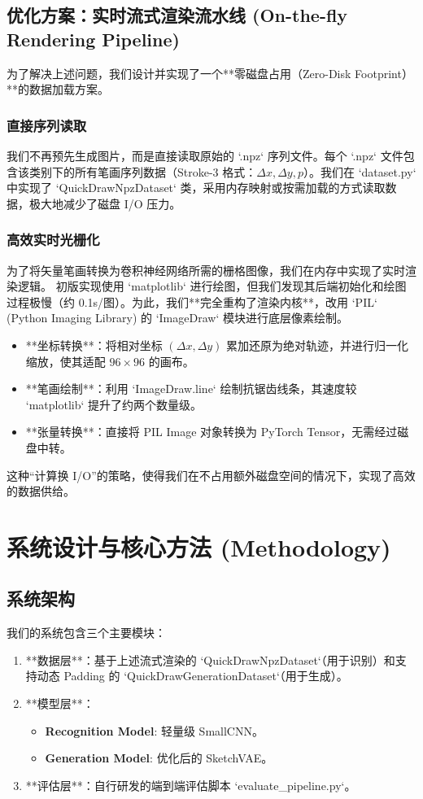 \documentclass{sjtuarticle}
\begin{document}
\subsection{优化方案：实时流式渲染流水线 (On-the-fly Rendering Pipeline)}
为了解决上述问题，我们设计并实现了一个**零磁盘占用（Zero-Disk Footprint）**的数据加载方案。

\subsubsection{直接序列读取}
我们不再预先生成图片，而是直接读取原始的 `.npz` 序列文件。每个 `.npz` 文件包含该类别下的所有笔画序列数据（Stroke-3 格式：$\Delta x, \Delta y, p$）。我们在 `dataset.py` 中实现了 `QuickDrawNpzDataset` 类，采用内存映射或按需加载的方式读取数据，极大地减少了磁盘 I/O 压力。

\subsubsection{高效实时光栅化}
为了将矢量笔画转换为卷积神经网络所需的栅格图像，我们在内存中实现了实时渲染逻辑。
初版实现使用 `matplotlib` 进行绘图，但我们发现其后端初始化和绘图过程极慢（约 0.1s/图）。为此，我们**完全重构了渲染内核**，改用 `PIL` (Python Imaging Library) 的 `ImageDraw` 模块进行底层像素绘制。

\begin{itemize}
    \item **坐标转换**：将相对坐标 $(\Delta x, \Delta y)$ 累加还原为绝对轨迹，并进行归一化缩放，使其适配 $96 \times 96$ 的画布。
    \item **笔画绘制**：利用 `ImageDraw.line` 绘制抗锯齿线条，其速度较 `matplotlib` 提升了约两个数量级。
    \item **张量转换**：直接将 PIL Image 对象转换为 PyTorch Tensor，无需经过磁盘中转。
\end{itemize}

这种“计算换 I/O”的策略，使得我们在不占用额外磁盘空间的情况下，实现了高效的数据供给。

\section{系统设计与核心方法 (Methodology)}

\subsection{系统架构}
我们的系统包含三个主要模块：
\begin{enumerate}
    \item **数据层**：基于上述流式渲染的 `QuickDrawNpzDataset`（用于识别）和支持动态 Padding 的 `QuickDrawGenerationDataset`（用于生成）。
    \item **模型层**：
        \begin{itemize}
            \item \textbf{Recognition Model}: 轻量级 SmallCNN。
            \item \textbf{Generation Model}: 优化后的 SketchVAE。
        \end{itemize}
    \item **评估层**：自行研发的端到端评估脚本 `evaluate\_pipeline.py`。
\end{enumerate}
\end{document}
